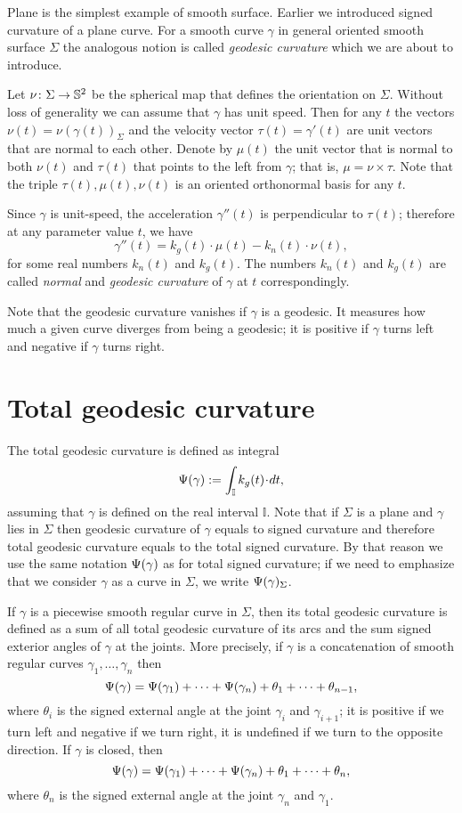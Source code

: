 Plane is the simplest example of smooth surface.
Earlier we introduced signed curvature of a plane curve.
For a smooth curve $\gamma$ in general oriented smooth surface $\Sigma$ the analogous notion is called \emph{geodesic curvature} which we are about to introduce.

Let $\nu\colon\Sigma\to \mathbb{S}^2$ be the spherical map that defines the orientation on $\Sigma$.
Without loss of generality we can assume that $\gamma$ has unit speed.
Then for any $t$ the vectors $\nu(t)=\nu(\gamma(t))_\Sigma$ and the velocity vector $\tau(t)=\gamma'(t)$ are unit vectors that are normal to each other.
Denote by $\mu(t)$ the unit vector that is normal to both $\nu(t)$ and $\tau(t)$ that points to the left from $\gamma$; that is, $\mu=\nu\times \tau$.
Note that the triple $\tau(t),\mu(t),\nu(t)$ is an oriented orthonormal basis for any $t$.

Since $\gamma$ is unit-speed, the acceleration $\gamma''(t)$ is perpendicular to $\tau(t)$;
therefore at any parameter value $t$, we have
\[\gamma''(t)=k_g(t)\cdot \mu(t)-k_n(t)\cdot \nu(t),\]
for some real numbers $k_n(t)$ and $k_g(t)$.
The numbers $k_n(t)$ and $k_g(t)$ are called \emph{normal} and \emph{geodesic curvature} of $\gamma$ at $t$ correspondingly.

Note that the geodesic curvature vanishes if $\gamma$ is a geodesic. 
It measures how much a given curve diverges from being a geodesic;
it is positive if $\gamma$ turns left and negative if $\gamma$ turns right.

\section*{Total geodesic curvature}

The total geodesic curvature is defined as integral 
\[\tgc\gamma\df \int_{\mathbb{I}} k_g(t)\cdot dt,\]
assuming that $\gamma$ is defined on the real interval $\mathbb{I}$.
Note that if $\Sigma$ is a plane and $\gamma$ lies in $\Sigma$ then geodesic curvature of $\gamma$ equals to signed curvature and therefore total geodesic curvature equals to the total signed curvature.
By that reason we use the same notation $\Psi({\gamma})$ as for total signed curvature; if we need to emphasize that we consider $\gamma$ as a curve in $\Sigma$, we write $\Psi({\gamma})_\Sigma$.

If $\gamma$ is a piecewise smooth regular curve in $\Sigma$, then
its total geodesic curvature is defined as a sum of all total geodesic curvature of its arcs and the sum signed exterior angles of $\gamma$ at the joints.
More precisely, if $\gamma$ is a concatenation of smooth regular curves $\gamma_1,\dots,\gamma_n$ then
\[\Psi({\gamma})=\Psi({\gamma_1})+\dots+\Psi({\gamma_n})+\theta_1+\dots+\theta_{n-1},\]
where $\theta_i$ is the signed external angle at the joint $\gamma_i$ and $\gamma_{i+1}$; it is positive if we turn left and negative if we turn right, it is undefined if we turn to the opposite direction.
If $\gamma$ is closed, then 
\[\Psi({\gamma})=\Psi({\gamma_1})+\dots+\Psi({\gamma_n})+\theta_1+\dots+\theta_{n},\]
where $\theta_n$ is the signed external angle at the joint $\gamma_n$ and $\gamma_1$.


